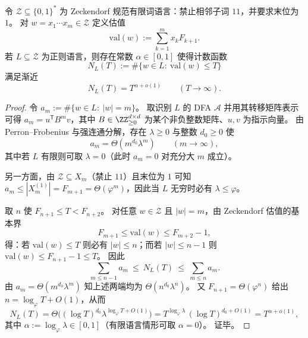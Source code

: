 \begin{theorem}\label{thm:zeta-syntax-zeckendorf-regular-valuation-powerlaw}
令 \(\mathcal Z\subseteq\{0,1\}^\ast\) 为 Zeckendorf 规范有限词语言：禁止相邻子词 \(11\)，并要求末位为 \(1\)。
对 \(w=x_1\cdots x_m\in\mathcal Z\) 定义估值
\[
\mathrm{val}(w):=\sum_{k=1}^{m}x_k F_{k+1}.
\]
若 \(L\subseteq\mathcal Z\) 为正则语言，则存在常数 \(\alpha\in[0,1]\) 使得计数函数
\[
N_L(T):=\#\{w\in L:\ \mathrm{val}(w)\le T\}
\]
满足渐近
\[
N_L(T)=T^{\alpha+o(1)}\qquad(T\to\infty).
\]
\end{theorem}
\begin{proof}
令 \(a_m:=\#\{w\in L:\ |w|=m\}\)。
取识别 \(L\) 的 DFA \(\mathcal A\) 并用其转移矩阵表示可得 \(a_m=u^{\mathsf T}B^m v\)，其中 \(B\in\ZZ_{\ge 0}^{d\times d}\) 为某个非负整数矩阵、\(u,v\) 为指示向量。
由 Perron--Frobenius 与强连通分解，存在 \(\lambda\ge 0\) 与整数 \(d_0\ge 0\) 使
\[
a_m=\Theta(m^{d_0}\lambda^m)\qquad(m\to\infty),
\]
其中若 \(L\) 有限则可取 \(\lambda=0\)（此时 \(a_m=0\) 对充分大 \(m\) 成立）。
\par
另一方面，由 \(\mathcal Z\subseteq X_m\)（禁止 \(11\)）且末位为 \(1\) 可知 \(a_m\le |X_m^{(1)}|=F_{m+1}=\Theta(\varphi^m)\)，因此当 \(L\) 无穷时必有 \(\lambda\le \varphi\)。
\par
取 \(n\) 使 \(F_{n+1}\le T<F_{n+2}\)。
对任意 \(w\in\mathcal Z\) 且 \(|w|=m\)，由 Zeckendorf 估值的基本界
\[
F_{m+1}\le \mathrm{val}(w)\le F_{m+2}-1,
\]
得：若 \(\mathrm{val}(w)\le T\) 则必有 \(|w|\le n\)；而若 \(|w|\le n-1\) 则 \(\mathrm{val}(w)\le F_{n+1}-1\le T\)。
因此
\[
\sum_{m\le n-1}a_m\ \le\ N_L(T)\ \le\ \sum_{m\le n}a_m.
\]
由 \(a_m=\Theta(m^{d_0}\lambda^m)\) 知上述两端均为 \(\Theta(n^{d_0}\lambda^n)\)。
又 \(F_{n+1}=\Theta(\varphi^n)\) 给出 \(n=\log_\varphi T+O(1)\)，从而
\[
N_L(T)=\Theta\!\bigl((\log T)^{d_0}\lambda^{\log_\varphi T+O(1)}\bigr)
=T^{\log_\varphi\lambda}\,(\log T)^{d_0+O(1)}
=T^{\alpha+o(1)},
\]
其中 \(\alpha:=\log_\varphi\lambda\in[0,1]\)（有限语言情形可取 \(\alpha=0\)）。
证毕。
\end{proof}

